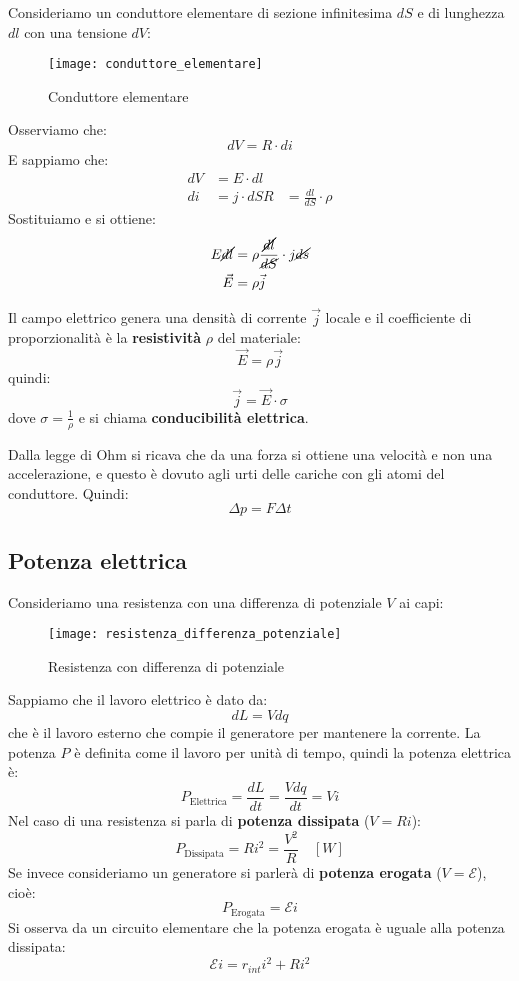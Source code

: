 \documentclass[a4paper]{article}
\begin{document}
\vspace{1em}
\noindent
Consideriamo un conduttore elementare di sezione infinitesima \( dS \) e di lunghezza
\( dl \) con una tensione \( dV \):
\begin{figure}[H]
  \centering
  \texttt{[image: conduttore\_elementare]}
  \caption{Conduttore elementare}
\end{figure}
\noindent
Osserviamo che:
\[
  dV = R \cdot di
\] 
E sappiamo che:
\[
  \begin{aligned}
    dV &= E \cdot dl \\
    di &= j \cdot dS
    R &= \frac{dl}{dS} \cdot \rho
  \end{aligned}
\] 
Sostituiamo e si ottiene:
\[
  \begin{aligned}
    E\cancel{dl} &= \rho \frac{\cancel{dl}}{\cancel{dS}} \cdot j\cancel{ds}\\
    \vec{E} &= \rho \vec{j}
  \end{aligned}
\] 
\begin{definition}
  Il campo elettrico genera una densità di corrente \( \vec{j} \) locale e il coefficiente
  di proporzionalità è la \textbf{resistività} \( \rho \) del materiale:
  \[
    \vec{E} = \rho \vec{j}
  \] 
  quindi:
  \[
    \vec{j} = \vec{E} \cdot \sigma
  \] 
  dove \( \sigma = \frac{1}{\rho} \) e si chiama \textbf{conducibilità elettrica}.
\end{definition}
Dalla legge di Ohm si ricava che da una forza si ottiene una velocità e non una accelerazione,
e questo è dovuto agli urti delle cariche con gli atomi del conduttore. Quindi:
\[
  \Delta p = F \Delta t
\] 

\subsection{Potenza elettrica}
Consideriamo una resistenza con una differenza di potenziale \( V \) ai capi:
\begin{figure}[H]
  \centering
  \texttt{[image: resistenza\_differenza\_potenziale]}
  \caption{Resistenza con differenza di potenziale}
\end{figure}
\noindent
Sappiamo che il lavoro elettrico è dato da:
\[
  dL = V dq
\] 
che è il lavoro esterno che compie il generatore per mantenere la corrente.
La potenza \( P \) è definita come il lavoro per unità di tempo, quindi la potenza
elettrica è:
\[
  P_{\text{Elettrica}} = \frac{dL}{dt} = \frac{V dq}{dt} = V i
\] 
Nel caso di una resistenza si parla di \textbf{potenza dissipata} (\( V = Ri \)):
\[
  P_{\text{Dissipata}} = R i^2 = \frac{V^2}{R} \quad \left[ W \right]
\] 
Se invece consideriamo un generatore si parlerà di \textbf{potenza erogata} 
(\( V = \mathcal{E} \)), cioè:
\[
  P_{\text{Erogata}} = \mathcal{E} i
\] 
Si osserva da un circuito elementare che la potenza erogata è uguale alla potenza dissipata:
\[
  \mathcal{E}i = r_{int} i^2 + Ri^2
\] 
\end{document}
